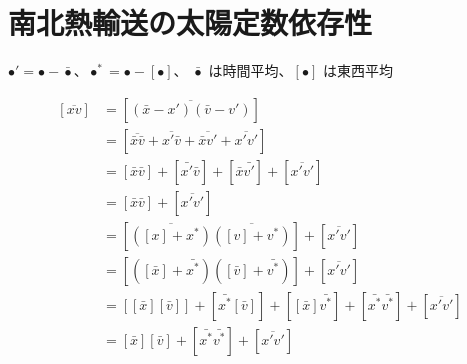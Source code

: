 \documentclass[body]{subfiles}
\begin{document}
\section{南北熱輸送の太陽定数依存性}

\(\bullet'=\bullet-\bar\bullet\)、\(\bullet^*=\bullet-[\bullet]\)、
\(\bar\bullet\) は時間平均、\([\bullet]\) は東西平均

\begin{equation}
	\begin{split}
		[\overline{xv}]&=[\overline{(\bar x-x')(\bar v-v')}]\\
		&=[\overline{\bar x\bar v}+\overline{x'\bar v}+\overline{\bar xv'}+\overline{x'v'}]\\
		&=[\bar x\bar v]+[\bar{x'}\bar v]+[\bar x\bar{v'}]+[\overline{x'v'}]\\
		&=[\bar x\bar v]+[\overline{x'v'}]\\
		&=[\overline{([x]+x^*)}\overline{([v]+v^*)}]+[\overline{x'v'}]\\
		&=[([\bar x]+\bar{x^*})([\bar v]+\bar{v^*})]+[\overline{x'v'}]\\
		&=[[\bar x][\bar v]]+[\bar{x^*}[\bar v]]+[[\bar x]\bar{v^*}]+[\bar{x^*}\bar{v^*}]+[\overline{x'v'}]\\
		&=[\bar x][\bar v]+[\bar{x^*}\bar{v^*}]+[\overline{x'v'}]
	\end{split}
\end{equation}
\end{document}
